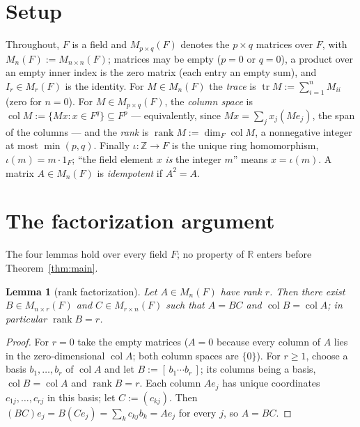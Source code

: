 \documentclass[11pt]{article}
\newtheorem{lemma}[theorem]{Lemma}
\begin{document}
\section{Setup}\label{sec:setup}

Throughout, $F$ is a field and $M_{p\times q}(F)$ denotes the $p\times q$ matrices
over $F$, with $M_n(F) := M_{n\times n}(F)$; matrices may be empty ($p=0$ or $q=0$),
a product over an empty inner index is the zero matrix (each entry an empty sum),
and $I_r \in M_r(F)$ is the identity. For $M \in M_n(F)$ the \emph{trace} is
$\operatorname{tr} M := \sum_{i=1}^n M_{ii}$ (zero for $n=0$). For
$M \in M_{p\times q}(F)$, the \emph{column space} is
$\operatorname{col} M := \{Mx : x \in F^q\} \subseteq F^p$ --- equivalently, since
$Mx = \sum_j x_j (Me_j)$, the span of the columns --- and the \emph{rank} is
$\operatorname{rank} M := \dim_F \operatorname{col} M$, a nonnegative integer at most
$\min(p,q)$. Finally $\iota : \mathbb{Z} \to F$ is the unique ring homomorphism,
$\iota(m) = m\cdot 1_F$; ``the field element $x$ \emph{is} the integer $m$'' means
$x = \iota(m)$. A matrix $A \in M_n(F)$ is \emph{idempotent} if $A^2 = A$.

\section{The factorization argument}\label{sec:factorization}

The four lemmas hold over every field $F$; no property of $\mathbb{R}$ enters before
Theorem~\ref{thm:main}.

\begin{lemma}[rank factorization]\label{lem:factor}
Let $A \in M_n(F)$ have rank $r$. Then there exist $B \in M_{n\times r}(F)$ and
$C \in M_{r\times n}(F)$ such that $A = BC$ and
$\operatorname{col} B = \operatorname{col} A$; in particular
$\operatorname{rank} B = r$.
\end{lemma}

\begin{proof}
For $r = 0$ take the empty matrices ($A = 0$ because every column of $A$ lies in the
zero-dimensional $\operatorname{col} A$; both column spaces are $\{0\}$). For $r \ge 1$, choose a basis
$b_1,\dots,b_r$ of $\operatorname{col} A$ and let $B := [\,b_1 \cdots b_r\,]$; its
columns being a basis, $\operatorname{col} B = \operatorname{col} A$ and
$\operatorname{rank} B = r$. Each column $Ae_j$ has unique coordinates
$c_{1j},\dots,c_{rj}$ in this basis; let $C := (c_{kj})$. Then
$(BC)e_j = B(Ce_j) = \sum_k c_{kj} b_k = Ae_j$ for every $j$, so $A = BC$.
\end{proof}
\end{document}
